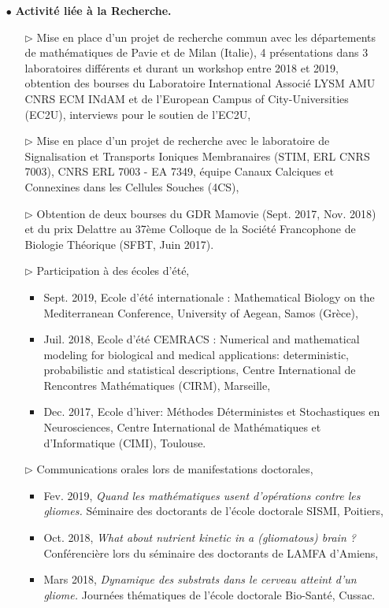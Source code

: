 \documentclass[a4paper, 12pt, twoside, openright]{article}
\begin{document}
\begin{itemize}
\vfill

\item[\color{MagSombre}$\bullet$] {\color{MagSombre}\textbf{Activité liée à la Recherche.}}
\begin{itemize}
\item[$\triangleright$] Mise en place d'un projet de recherche commun avec les départements de mathématiques de Pavie et de Milan (Italie), 4 présentations dans 3 laboratoires différents et durant un workshop entre 2018 et 2019, obtention des bourses du Laboratoire International Associé LYSM AMU CNRS ECM INdAM et de l'European Campus of City-Universities (EC2U), interviews pour le soutien de l'EC2U,
\item[$\triangleright$] Mise en place d'un projet de recherche avec le laboratoire de Signalisation et Transports Ioniques Membranaires (STIM, ERL CNRS 7003), CNRS ERL 7003 - EA 7349, équipe Canaux Calciques et Connexines dans les Cellules Souches (4CS),
\item[$\triangleright$] Obtention de deux bourses du GDR Mamovie (Sept. 2017, Nov. 2018) et du prix Delattre au 37ème Colloque de la Société Francophone de Biologie Théorique (SFBT, Juin 2017).
\item[$\triangleright$] Participation à des écoles d'été,
\begin{itemize}
\item Sept. 2019, Ecole d'été internationale : Mathematical Biology on the Mediterranean Conference, University of Aegean, Samos (Grèce),
\item Juil. 2018, \textmd{Ecole d'été CEMRACS : Numerical and mathematical modeling for biological and medical applications: deterministic, probabilistic and statistical descriptions}, Centre International de Rencontres Mathématiques (CIRM), Marseille,
\item Dec. 2017, \textmd{Ecole d'hiver: Méthodes Déterministes et Stochastiques en Neurosciences}, Centre International de Mathématiques et d'Informatique (CIMI), Toulouse.
\end{itemize}
\item[$\triangleright$] Communications orales lors de manifestations doctorales, 
\begin{itemize}
\item Fev. 2019, \emph{Quand les mathématiques usent d'opérations contre les gliomes.} Séminaire des doctorants de l'école doctorale SISMI, Poitiers, 
\item Oct. 2018, \emph{What about nutrient kinetic in a (gliomatous) brain ?} Conférencière lors du séminaire des doctorants de LAMFA d'Amiens,
\item Mars 2018, \emph{Dynamique des substrats dans le cerveau atteint d'un gliome.} Journées thématiques de l'école doctorale Bio-Santé, Cussac.
\end{itemize}

\end{itemize}
\end{itemize}
\vfill
\end{document}
